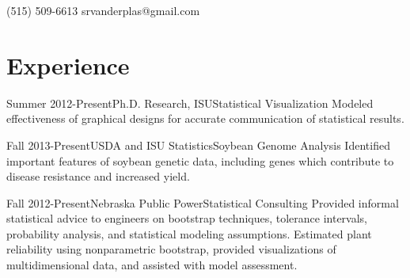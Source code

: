 \documentclass[10pt]{tccv}
\begin{document}
    {(515) 509-6613}
    {srvanderplas@gmail.com}

\section{Experience}
\begin{eventlist}
% 

\item{Summer 2012-Present}{Ph.D. Research, ISU}{Statistical Visualization}{
Modeled effectiveness of graphical designs for accurate communication of statistical results. 
}

\item{Fall 2013-Present}{USDA and ISU Statistics}{Soybean Genome Analysis}{
Identified important features of soybean genetic data, including genes which contribute to disease resistance and increased yield. 
}

\item{Fall 2012-Present}{Nebraska Public Power}{Statistical Consulting}{
Provided informal statistical advice to engineers on bootstrap techniques, tolerance intervals, probability analysis, and statistical modeling assumptions. 
Estimated plant reliability using nonparametric bootstrap, provided visualizations of multidimensional data, and assisted with model assessment. 
}


\end{eventlist}
\end{document}

